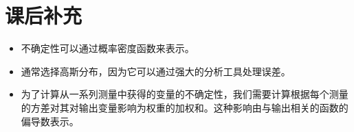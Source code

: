 \section{课后补充}

\begin{itemize}

\item 不确定性可以通过概率密度函数来表示。
\item 通常选择高斯分布，因为它可以通过强大的分析工具处理误差。
\item 为了计算从一系列测量中获得的变量的不确定性，我们需要计算根据每个测量的方差对其对输出变量影响为权重的加权和。这种影响由与输出相关的函数的偏导数表示。
\end{itemize}

